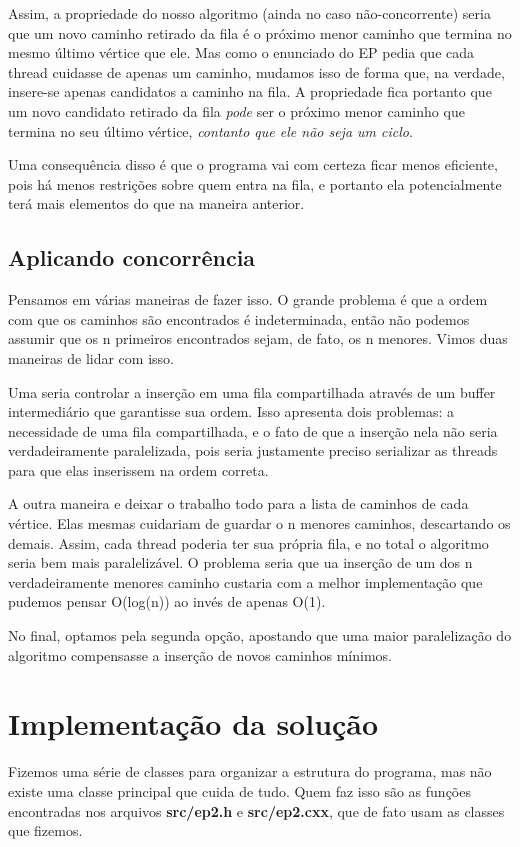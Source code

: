 \documentclass[a4paper,11pt]{article}
\begin{document}
    Assim, a propriedade do nosso algoritmo (ainda no caso não-concorrente)
    seria que um novo caminho retirado da fila é o próximo menor caminho que
    termina no mesmo último vértice que ele. Mas como o enunciado do EP pedia
    que cada thread cuidasse de apenas um caminho, mudamos isso de forma que, na
    verdade, insere-se apenas candidatos a caminho na fila. A propriedade fica
    portanto que um novo candidato retirado da fila \textit{pode} ser o próximo
    menor caminho que termina no seu último vértice, \textit{contanto que ele
    não seja um ciclo}.

    Uma consequência disso é que o programa vai com certeza ficar menos
    eficiente, pois há menos restrições sobre quem entra na fila, e portanto ela
    potencialmente terá mais elementos do que na maneira anterior.

  \subsection{Aplicando concorrência}
    Pensamos em várias maneiras de fazer isso. O grande problema é que a ordem
    com que os caminhos são encontrados é indeterminada, então não podemos
    assumir que os n primeiros encontrados sejam, de fato, os n menores. Vimos
    duas maneiras de lidar com isso.

    Uma seria controlar a inserção em uma fila compartilhada através de um
    buffer intermediário que garantisse sua ordem. Isso apresenta dois
    problemas: a necessidade de uma fila compartilhada, e o fato de que a
    inserção nela não seria verdadeiramente paralelizada, pois seria justamente
    preciso serializar as threads para que elas inserissem na ordem correta.

    A outra maneira e deixar o trabalho todo para a lista de caminhos de cada
    vértice. Elas mesmas cuidariam de guardar o n menores caminhos, descartando
    os demais. Assim, cada thread poderia ter sua própria fila, e no total o
    algoritmo seria bem mais paralelizável. O problema seria que ua inserção de
    um dos n verdadeiramente menores caminho custaria com a melhor implementação
    que pudemos pensar O(log(n)) ao invés de apenas O(1).

    No final, optamos pela segunda opção, apostando que uma maior paralelização
    do algoritmo compensasse a inserção de novos caminhos mínimos.

\section{Implementação da solução}
  Fizemos uma série de classes para organizar a estrutura do programa, mas não
  existe uma classe principal que cuida de tudo. Quem faz isso são as funções
  encontradas nos arquivos \textbf{src/ep2.h} e \textbf{src/ep2.cxx}, que de
  fato usam as classes que fizemos.
\end{document}
